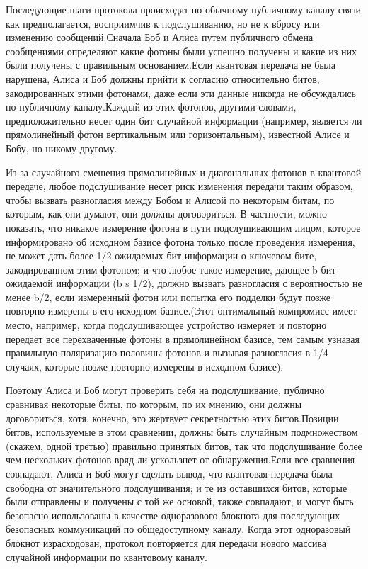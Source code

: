 ­­­­­Последующие шаги протокола происходят по обычному публичному каналу связи как предполагается, восприимчив к подслушиванию, но не к вбросу или изменению сообщений.Сначала Боб и Алиса путем публичного обмена сообщениями определяют какие фотоны были успешно получены и какие из них были получены с правильным основанием.Если квантовая передача не была нарушена, Алиса и Боб должны прийти к согласию относительно битов, закодированных этими фотонами, даже если эти данные никогда не обсуждались по публичному каналу.Каждый из этих фотонов, другими словами, предположительно несет один бит случайной информации (например, является ли прямолинейный фотон вертикальным или горизонтальным), известной Алисе и Бобу, но никому другому.

­­­Из-за случайного смешения прямолинейных и диагональных фотонов в квантовой передаче, любое подслушивание несет риск изменения передачи таким образом, чтобы вызвать разногласия между Бобом и Алисой по некоторым битам, по которым, как они думают, они должны договориться. В частности, можно показать, что никакое измерение фотона в пути подслушивающим лицом, которое информировано об исходном базисе фотона только после проведения измерения, не может дать более 1/2 ожидаемых бит информации о ключевом бите, закодированном этим фотоном; и что любое такое измерение, дающее b бит ожидаемой информации (b s 1/2), должно вызвать разногласия с вероятностью не менее b/2, если измеренный фотон или попытка его подделки будут позже повторно измерены в его исходном базисе.(Этот оптимальный компромисс имеет место, например, когда подслушивающее устройство измеряет и повторно передает все перехваченные фотоны в прямолинейном базисе, тем самым узнавая правильную поляризацию половины фотонов и вызывая разногласия в 1/4 случаях, которые позже повторно измерены в исходном базисе).

­­­Поэтому Алиса и Боб могут проверить себя на подслушивание, публично сравнивая некоторые биты, по которым, по их мнению, они должны договориться, хотя, конечно, это жертвует секретностью этих битов.Позиции битов, используемые в этом сравнении, должны быть случайным подмножеством (скажем, одной третью) правильно принятых битов, так что подслушивание более чем нескольких фотонов вряд ли ускользнет от обнаружения.Если все сравнения совпадают, Алиса и Боб могут сделать вывод, что квантовая передача была свободна от значительного подслушивания; и те из оставшихся битов, которые были отправлены и получены с той же основой, также совпадают, и могут быть безопасно использованы в качестве одноразового блокнота для последующих безопасных коммуникаций по общедоступному каналу. Когда этот одноразовый блокнот израсходован, протокол повторяется для передачи нового массива случайной информации по квантовому каналу.

